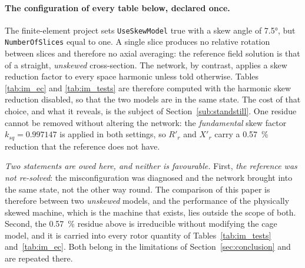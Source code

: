\documentclass[10pt,a4paper,twocolumn]{article}
\theoremstyle{plain}
\theoremstyle{remark}
\begin{document}
\paragraph{The configuration of every table below, declared once.}
The finite-element project sets \texttt{UseSkewModel} true with a skew
angle of \ang{7.5}, but \texttt{NumberOfSlices} equal to one. A single
slice produces no relative rotation between slices and therefore no
axial averaging: the reference field solution is that of a straight,
\emph{unskewed} cross-section. The network, by contrast, applies a skew
reduction factor to every space harmonic unless told otherwise. Tables
\ref{tab:im_ec} and \ref{tab:im_tests} are therefore computed with the
harmonic skew reduction disabled, so that the two models are in the same
state. The cost of that choice, and what it reveals, is the subject of
Section~\ref{sub:standstill}. One residue cannot be removed without
altering the network: the \emph{fundamental} skew factor
$k_{sq}=\num{0.997147}$ is applied in both settings, so $R'_r$ and
$X'_r$ carry a \SI{+0.57}{\percent} reduction that the reference does
not have.

\emph{Two statements are owed here, and neither is favourable.} First,
\emph{the reference was not re-solved}: the misconfiguration was
diagnosed and the network brought into the same state, not the other way
round. The comparison of this paper is therefore between two
\emph{unskewed} models, and the performance of the physically skewed
machine, which is the machine that exists, lies outside the scope of
both. Second, the \SI{+0.57}{\percent} residue above is irreducible
without modifying the cage model, and it is carried into every rotor
quantity of Tables~\ref{tab:im_tests} and~\ref{tab:im_ec}. Both belong
in the limitations of Section~\ref{sec:conclusion} and are repeated
there.
\end{document}
